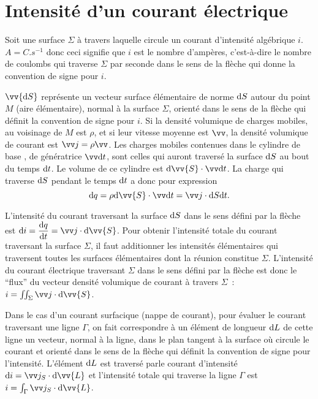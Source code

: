 \section{Intensité d'un courant électrique}
\label{chap9-sec:intensiteduncourantelectrique}

Soit une surface $\Sigma$ à travers laquelle circule un courant d'intensité algébrique $i$. $\si{A}=\si{C.s^{-1}}$ donc ceci signifie que $i$ est le nombre d'ampères, c'est-à-dire le nombre de coulombs qui traverse $\Sigma$ par seconde dans le sens de la flèche qui donne la convention de signe pour $i$.

$\vv{\D S}$ représente un vecteur surface élémentaire de norme $\mathrm{d} S$ autour du point $M$ (aire élémentaire), normal à la surface $\Sigma$, orienté dans le sens de la flèche qui définit la convention de signe pour $i$. Si la densité volumique de charges mobiles, au voisinage de $M$ est $\rho$, et si leur vitesse moyenne est $\vv$, la densité volumique de courant est $\vj = \rho \vv$.
Les charges mobiles contenues dans le cylindre de base , de génératrice $\vv \D t$, sont celles qui auront traversé la surface $\mathrm{d} S$ au bout du temps $\mathrm{d} t$. Le volume de ce cylindre est $\D \vv{S} \cdot \vv\D t$.
La charge qui traverse $\mathrm{d} S$ pendant le temps $\mathrm{d} t$ a donc pour expression
\begin{equation}
  \D q = \rho \D \vv{S} \cdot \vv \D t = \vj \cdot \D S \D t.
\end{equation}

L'intensité du courant traversant la surface $\mathrm{d} S$ dans le sens défini par la flèche est $\D i = \derived{q}{t} = \vj \cdot \D \vv{S}$.
Pour obtenir l'intensité totale du courant traversant la surface $\Sigma$, il faut additionner les intensités élémentaires qui traversent toutes les surfaces élémentaires dont la réunion constitue $\Sigma$.
L'intensité du courant électrique traversant $\Sigma$ dans le sens défini par la flèche est donc le ``flux'' du vecteur densité volumique de courant à travers $\Sigma$~: $i = \iint_\Sigma \vj \cdot \D \vv{S}$.

Dans le cas d'un courant surfacique (nappe de courant), pour évaluer le courant  traversant une ligne $\Gamma$, on fait correspondre à un élément de longueur $\mathrm{d} L$ de cette ligne un vecteur, normal à la ligne, dans le plan tangent à la surface où circule le courant et orienté dans le sens de la flèche qui définit la convention de signe pour l'intensité. L'élément $\mathrm{d} L$ est traversé parle courant d'intensité $\D i = \vj_S \cdot \D \vv{L}$ et l'intensité totale qui traverse la ligne $\Gamma$ est $i = \int_\Gamma \vj_S \cdot \D \vv{L}$.

